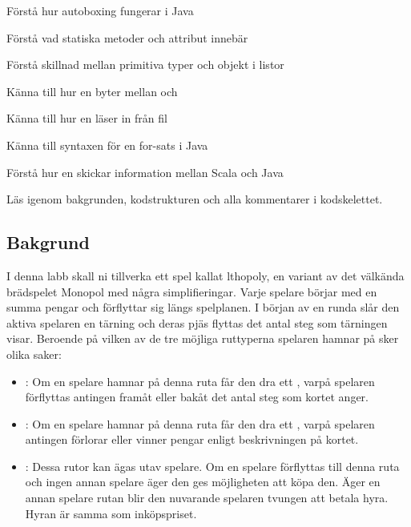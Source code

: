 

\Teamlab{\LabWeekTWELVE}

\begin{Goals}
\item Förstå hur autoboxing fungerar i Java
\item Förstå vad statiska metoder och attribut innebär
\item Förstå skillnad mellan primitiva typer och objekt i listor
\item Känna till hur en byter mellan  och 
\item Känna till hur en läser in från fil
\item Känna till syntaxen för en for-sats i Java
\item Förstå hur en skickar information mellan Scala och Java
\end{Goals}

\begin{Preparations}
\item {}
\item Läs igenom bakgrunden, kodstrukturen och alla kommentarer i kodskelettet.

\end{Preparations}

\subsection{Bakgrund}
I denna labb skall ni tillverka ett spel kallat lthopoly, en variant av det välkända brädspelet Monopol med några simplifieringar. Varje spelare börjar med en summa pengar och förflyttar sig längs spelplanen.
I början av en runda slår den aktiva spelaren en tärning och deras pjäs flyttas det antal steg som tärningen visar.
Beroende på vilken av de tre möjliga ruttyperna spelaren hamnar på sker olika saker:

\begin{itemize}
\item {}: Om en spelare hamnar på denna ruta får den dra ett , varpå spelaren förflyttas antingen framåt eller bakåt det antal steg som kortet anger.
\item {}: Om en spelare hamnar på denna ruta får den dra ett , varpå spelaren antingen förlorar eller vinner pengar enligt beskrivningen på kortet.
\item {}: Dessa rutor kan ägas utav spelare. Om en spelare förflyttas till denna ruta och ingen annan spelare äger den ges möjligheten att köpa den. Äger en annan spelare rutan blir den nuvarande spelaren tvungen att betala hyra. Hyran är samma som inköpspriset.
\end{itemize}

